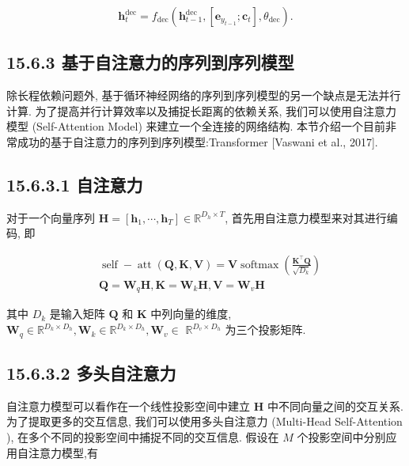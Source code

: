 \documentclass[10pt]{article}
\begin{document}
\begin{equation*}
\boldsymbol{h}_{t}^{\mathrm{dec}}=f_{\mathrm{dec}}\left(\boldsymbol{h}_{t-1}^{\mathrm{dec}},\left[\boldsymbol{e}_{y_{t-1}} ; \boldsymbol{c}_{t}\right], \theta_{\mathrm{dec}}\right) . \tag{15.106}
\end{equation*}




\subsection*{15.6.3 基于自注意力的序列到序列模型}
除长程依赖问题外, 基于循环神经网络的序列到序列模型的另一个缺点是无法并行计算. 为了提高并行计算效率以及捕捉长距离的依赖关系, 我们可以使用自注意力模型 (Self-Attention Model) 来建立一个全连接的网络结构. 本节介绍一个目前非常成功的基于自注意力的序列到序列模型:Transformer [Vaswani et al., 2017].

\subsection*{15.6.3.1 自注意力}
对于一个向量序列 $\boldsymbol{H}=\left[\boldsymbol{h}_{1}, \cdots, \boldsymbol{h}_{T}\right] \in \mathbb{R}^{D_{h} \times T}$, 首先用自注意力模型来对其进行编码, 即


\begin{align*}
& \operatorname{self}-\operatorname{att}(\boldsymbol{Q}, \boldsymbol{K}, \boldsymbol{V})=\boldsymbol{V} \operatorname{softmax}\left(\frac{\boldsymbol{K}^{\top} \boldsymbol{Q}}{\sqrt{D_{k}}}\right)  \tag{15.107}\\
& \boldsymbol{Q}=\boldsymbol{W}_{q} \boldsymbol{H}, \boldsymbol{K}=\boldsymbol{W}_{k} \boldsymbol{H}, \boldsymbol{V}=\boldsymbol{W}_{v} \boldsymbol{H} \tag{15.108}
\end{align*}


其中 $D_{k}$ 是输入矩阵 $\boldsymbol{Q}$ 和 $\boldsymbol{K}$ 中列向量的维度, $\boldsymbol{W}_{q} \in \mathbb{R}^{D_{k} \times D_{h}}, \boldsymbol{W}_{k} \in \mathbb{R}^{D_{k} \times D_{h}}, \boldsymbol{W}_{v} \in$ $\mathbb{R}^{D_{v} \times D_{h}}$ 为三个投影矩阵.

\subsection*{15.6.3.2 多头自注意力}
自注意力模型可以看作在一个线性投影空间中建立 $\boldsymbol{H}$ 中不同向量之间的交互关系. 为了提取更多的交互信息, 我们可以使用多头自注意力 (Multi-Head Self-Attention ), 在多个不同的投影空间中捕捉不同的交互信息. 假设在 $M$ 个投影空间中分别应用自注意力模型,有
\end{document}
